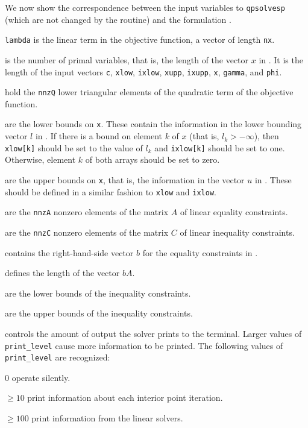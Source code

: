 We now show the correspondence between the input variables to
\texttt{qpsolvesp} (which are not changed by the routine) and the
formulation .
\begin{parameters}{\texttt{lambda}}
   is the linear term in the objective function, a vector of
length \texttt{nx}.
  
   is the number of primal variables, that is, the length of
the vector $x$ in . It is the length of the input vectors
\texttt{c}, \texttt{xlow}, \texttt{ixlow}, \texttt{xupp},
\texttt{ixupp}, \texttt{x}, \texttt{gamma}, and \texttt{phi}.

   hold the \texttt{nnzQ} lower triangular
elements of the quadratic term of the objective function.

   are the lower bounds on \texttt{x}. These contain
the information in the lower bounding vector $l$ in . If
there is a bound on element $k$ of $x$ (that is, $l_k > -\infty$),
then \texttt{xlow[k]} should be set to the value of $l_k$ and
\texttt{ixlow[k]} should be set to one. Otherwise, element $k$ of both
arrays should be set to zero.

   are the upper bounds on \texttt{x}, that is, the
information in the vector $u$ in . These should be
defined in a similar fashion to \texttt{xlow} and \texttt{ixlow}.

   are the \texttt{nnzA} nonzero elements of
the matrix $A$ of linear equality constraints.
  
   are the \texttt{nnzC} nonzero elements of
the matrix $C$ of linear inequality constraints.

   contains the right-hand-side vector $b$ for the equality
constraints in . 

   defines the length of the vector $bA$.


   are the lower bounds of the inequality
  constraints.
  
   are the upper bounds of the inequality
  constraints.

   controls the amount of output the solver prints
  to the terminal. Larger values of \texttt{print\_level} cause more
  information to be printed. The following values of
  \texttt{print\_level} are recognized:
  \begin{description}
    \item{$0$} operate silently.
    \item{$\geq 10$} print information about each interior point
      iteration.
    \item{$\geq 100$} print information from the linear solvers.
    \end{description}
\end{parameters}

